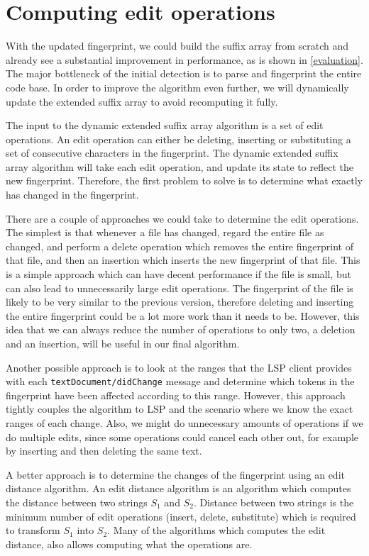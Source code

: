 \section{Computing edit operations}

With the updated fingerprint, we could build the suffix array from scratch and already see
a substantial improvement in performance, as is shown in \cref{evaluation}. The major
bottleneck of the initial detection is to parse and fingerprint the entire code base. In
order to improve the algorithm even further, we will dynamically update the extended
suffix array to avoid recomputing it fully.

The input to the dynamic extended suffix array algorithm is a set of edit operations. An
edit operation can either be deleting, inserting or substituting a set of consecutive
characters in the fingerprint. The dynamic extended suffix array algorithm will take each
edit operation, and update its state to reflect the new fingerprint. Therefore, the first
problem to solve is to determine what exactly has changed in the fingerprint. 

There are a couple of approaches we could take to determine the edit operations. The
simplest is that whenever a file has changed, regard the entire file as changed, and
perform a delete operation which removes the entire fingerprint of that file, and then an
insertion which inserts the new fingerprint of that file. This is a simple approach which
can have decent performance if the file is small, but can also lead to unnecessarily large
edit operations. The fingerprint of the file is likely to be very similar to the previous
version, therefore deleting and inserting the entire fingerprint could be a lot more work
than it needs to be. However, this idea that we can always reduce the number of operations
to only two, a deletion and an insertion, will be useful in our final algorithm.

Another possible approach is to look at the ranges that the LSP client provides with each
\verb|textDocument/didChange| message and determine which tokens in the fingerprint have
been affected according to this range. However, this approach tightly couples the
algorithm to LSP and the scenario where we know the exact ranges of each change. Also, we
might do unnecessary amounts of operations if we do multiple edits, since some operations
could cancel each other out, for example by inserting and then deleting the same text.

A better approach is to determine the changes of the fingerprint using an edit distance
algorithm. An edit distance algorithm is an algorithm which computes the distance between
two strings $S_1$ and $S_2$. Distance between two strings is the minimum number of edit
operations (insert, delete, substitute) which is required to transform $S_1$ into $S_2$.
Many of the algorithms which computes the edit distance, also allows computing what the
operations are.

